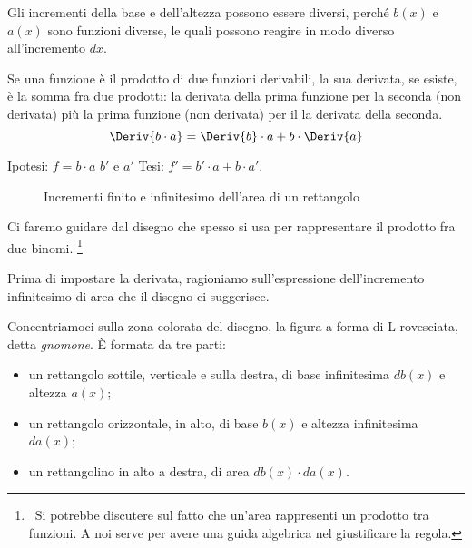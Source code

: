 \begin{osservazione}
Gli incrementi della base e dell'altezza possono essere 
diversi, perché \(b(x)\) e \(a(x)\) sono funzioni diverse, le quali possono
reagire in modo diverso all'incremento \(dx\).
\end{osservazione}

\begin{teorema}
Se una funzione è il prodotto di due funzioni derivabili, 
la sua  derivata, se esiste, è la somma fra due prodotti: la derivata 
della prima funzione per la seconda (non derivata) più la prima funzione 
(non derivata) per il la derivata della seconda.
\[\Deriv{b \cdot a}=\Deriv{b} \cdot a + b \cdot \Deriv{a}\]
\end{teorema}
\noindent Ipotesi: \(f = b \cdot a\) 
\(b'\) e \(a'\) \tab 
Tesi: \(f' = b' \cdot a + b \cdot a'\).

\begin{figure}[h]
\begin{inaccessibleblock}
 \begin{center}
 \begin{minipage}[]{.38 \textwidth}
  \vspace{23mm} 
  \incrementaleprodotto
 \end{minipage} 
 \hfill
 \begin{minipage}[]{.58 \textwidth}
  \differenzialeprodotto
 \end{minipage}
 \end{center}
\end{inaccessibleblock}
\caption{Incrementi finito e infinitesimo dell'area di un rettangolo} 
\label{fig:Incre_prodotto}
\end{figure}
Ci faremo guidare dal disegno che spesso si usa per rappresentare il 
prodotto fra due binomi. 
\footnote{~Si potrebbe discutere sul fatto che 
un'area rappresenti un prodotto tra funzioni. 
A noi serve per avere una guida algebrica nel giustificare la regola.}

Prima di impostare la derivata, ragioniamo sull'espressione 
dell'incremento infinitesimo di area che il disegno ci suggerisce. 

Concentriamoci sulla zona colorata del disegno, la figura a forma 
di L rovesciata, detta \emph{gnomone}. È formata da tre parti:
\begin{itemize} [nosep]
 \item un rettangolo sottile, verticale e sulla destra, di base
 infinitesima \(db(x)\) e altezza \(a(x)\);
 \item un rettangolo orizzontale, in alto, di base \(b(x)\) e
 altezza infinitesima \(da(x)\);
 \item un rettangolino in alto a destra, di area \(db(x) \cdot da(x)\).
\end{itemize}

